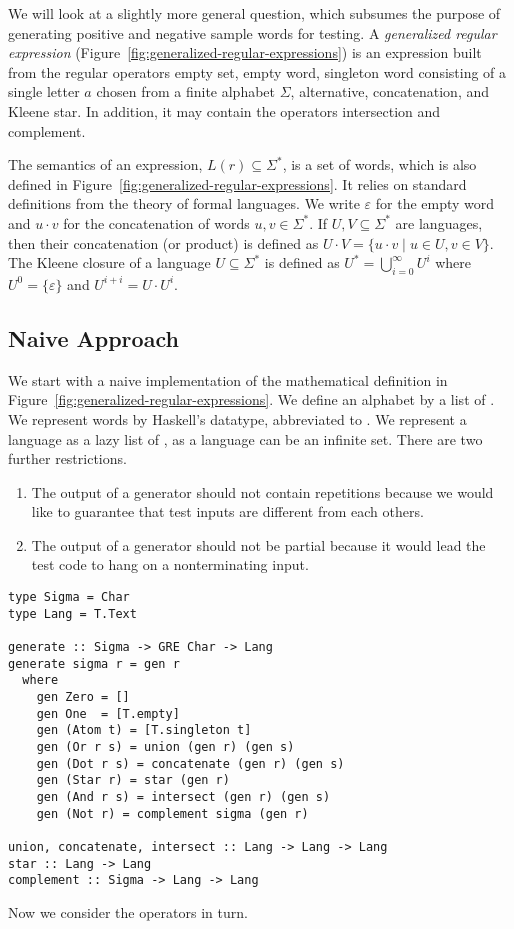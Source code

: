 We will look at a slightly more general question, which subsumes the
purpose of generating positive and negative sample words for
testing. A \emph{generalized regular expression}
(Figure~\ref{fig:generalized-regular-expressions}) is an expression
built from the regular operators empty set, empty word, singleton word
consisting of a single letter $a$ chosen from a finite alphabet
$\Sigma$, alternative, concatenation, and Kleene star. In addition, it
may contain the operators intersection and complement.

The semantics of an expression, $L(r) \subseteq \Sigma^*$, is a set of
words, which is also defined in
Figure~\ref{fig:generalized-regular-expressions}. It relies on
standard definitions from the theory of formal languages. We write
$\varepsilon$ for the empty word and $u\cdot v$ for the concatenation
of words $u, v \in \Sigma^*$. If $U, V \subseteq \Sigma^*$ are
languages, then their concatenation (or product) is defined as $U\cdot
V = \{ u\cdot v \mid u\in U, v\in V\}$. The Kleene closure of a
language $U\subseteq \Sigma^*$ is defined as $U^* =
\bigcup_{i=0}^\infty U^i$ where $U^0 = \{\varepsilon\}$ and $U^{i+i} =
U \cdot U^i$. 

\subsection{Naive Approach}
\label{sec:naive-approach}

We start with a naive implementation of the mathematical definition in
Figure~\ref{fig:generalized-regular-expressions}. We define an
alphabet by a list of .  We represent words by Haskell's
 datatype, abbreviated to . We
represent a language as a lazy list of , as a language
can be an infinite set. There are two further restrictions.
\begin{enumerate}
\item The output of a generator should not contain repetitions
  because we would like to guarantee that test inputs are different
  from each others.
\item The output of a generator should not be partial because it would
  lead the test code to hang on a nonterminating input.
\end{enumerate}
\begin{lstlisting}
type Sigma = Char
type Lang = T.Text

generate :: Sigma -> GRE Char -> Lang
generate sigma r = gen r
  where
    gen Zero = []
    gen One  = [T.empty]
    gen (Atom t) = [T.singleton t]
    gen (Or r s) = union (gen r) (gen s)
    gen (Dot r s) = concatenate (gen r) (gen s)
    gen (Star r) = star (gen r)
    gen (And r s) = intersect (gen r) (gen s)
    gen (Not r) = complement sigma (gen r)

union, concatenate, intersect :: Lang -> Lang -> Lang
star :: Lang -> Lang
complement :: Sigma -> Lang -> Lang
\end{lstlisting}
Now we consider the operators in turn.

